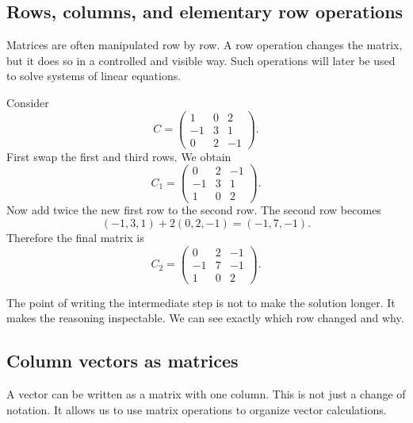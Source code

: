 \subsection{Rows, columns, and elementary row operations}

Matrices are often manipulated row by row. A row operation changes the matrix, but it does so in a controlled and visible way. Such operations will later be used to solve systems of linear equations.

\begin{examplebox}
Consider
\[
C=
\begin{pmatrix}
1 & 0 & 2\\
-1 & 3 & 1\\
0 & 2 & -1
\end{pmatrix}.
\]
First swap the first and third rows. We obtain
\[
C_1=
\begin{pmatrix}
0 & 2 & -1\\
-1 & 3 & 1\\
1 & 0 & 2
\end{pmatrix}.
\]
Now add twice the new first row to the second row. The second row becomes
\[
(-1,3,1)+2(0,2,-1)=(-1,7,-1).
\]
Therefore the final matrix is
\[
C_2=
\begin{pmatrix}
0 & 2 & -1\\
-1 & 7 & -1\\
1 & 0 & 2
\end{pmatrix}.
\]
\end{examplebox}

The point of writing the intermediate step is not to make the solution longer. It makes the reasoning inspectable. We can see exactly which row changed and why.

\subsection{Column vectors as matrices}

A vector can be written as a matrix with one column. This is not just a change of notation. It allows us to use matrix operations to organize vector calculations.


